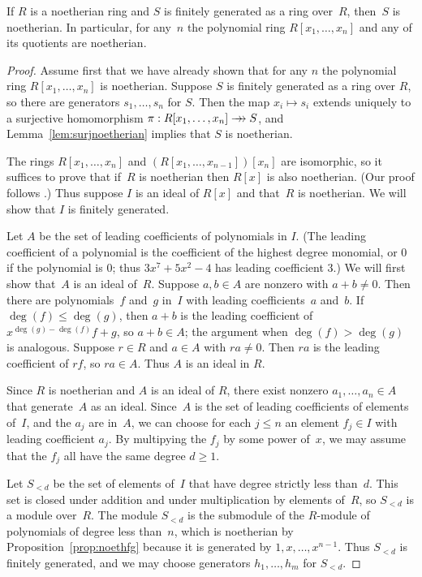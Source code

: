 \begin{theorem}
	\label{thm:hilbert}
	If $R$ is a noetherian ring and $S$ is finitely generated as a ring
	over~$R$, then~$S$ is noetherian.  In particular, for any~$n$ the
	polynomial ring $R[x_1,\ldots, x_n]$ and any of its quotients are
	noetherian.
\end{theorem}
\begin{proof}
Assume first that we have already shown that for any $n$ the
polynomial ring $R[x_1,\ldots, x_n]$ is noetherian.  Suppose $S$ is
finitely generated as a ring over $R$, so there are generators
$s_1,\ldots, s_n$ for $S$.  Then the map $x_i\mapsto s_i$ extends
uniquely to a surjective homomorphism $\pi: R[x_1,\ldots, x_n] \rightarrow\!\!\!\!\rightarrow S$,
and Lemma~\ref{lem:surjnoetherian} implies that $S$ is noetherian.

The rings $R[x_1,\ldots, x_n]$ and $(R[x_1,\ldots,x_{n-1}])[x_n]$ are
isomorphic, so it suffices to prove that if~$R$ is noetherian then
$R[x]$ is also noetherian.  (Our proof follows
\cite[\S12.5]{artin:algebra}.)
Thus suppose $I$ is an ideal of $R[x]$ and that~$R$ is
noetherian.  We will show that $I$ is finitely generated.

Let $A$ be the set of leading coefficients of polynomials in $I$.
(The leading coefficient of a polynomial is the coefficient of
the highest degree monomial, or $0$ if the polynomial is $0$; thus
$3x^7 + 5x^2  - 4$ has leading coefficient $3$.)
We will first show that~$A$ is an ideal of~$R$.
Suppose $a,b\in A$ are nonzero with $a+b\neq 0$.  Then there are
polynomials~$f$ and~$g$ in~$I$ with leading coefficients~$a$ and~$b$.
If $\deg(f)\leq \deg(g)$, then $a+b$ is the leading coefficient of
$x^{\deg(g)-\deg(f)}f + g$, so $a+b\in A$; the argument when
$\deg(f)> \deg(g)$ is analogous.  Suppose $r\in R$ and $a\in A$
with $ra\neq 0$. Then $ra$ is the leading coefficient of $rf$, so
$ra\in A$.  Thus $A$ is an ideal in $R$.

Since $R$ is noetherian and $A$ is an ideal of $R$, there exist nonzero
$a_1,\ldots, a_n\in A$ that generate~$A$ as an ideal.  Since~$A$ is the set
of leading coefficients of elements of~$I$, and the $a_j$ are in~$A$,
we can choose for each $j\leq n$ an element $f_j\in I$ with leading
coefficient $a_j$.  By multipying the $f_j$ by some power of~$x$, we
may assume that the $f_j$ all have the same degree $d\geq 1$.

Let $S_{<d}$ be the set of elements of~$I$ that have degree strictly
less than~$d$.  This set is closed under addition and under
multiplication by elements of~$R$, so $S_{<d}$ is a module over~$R$.
The module $S_{<d}$ is the submodule of the $R$-module of polynomials
of degree less than~$n$, which is noetherian by
Proposition~\ref{prop:noethfg} because it is generated by $1,x,\ldots,
x^{n-1}$.  Thus $S_{<d}$ is finitely generated, and we may choose
generators $h_1,\ldots, h_m$ for $S_{<d}$.


\end{proof}
